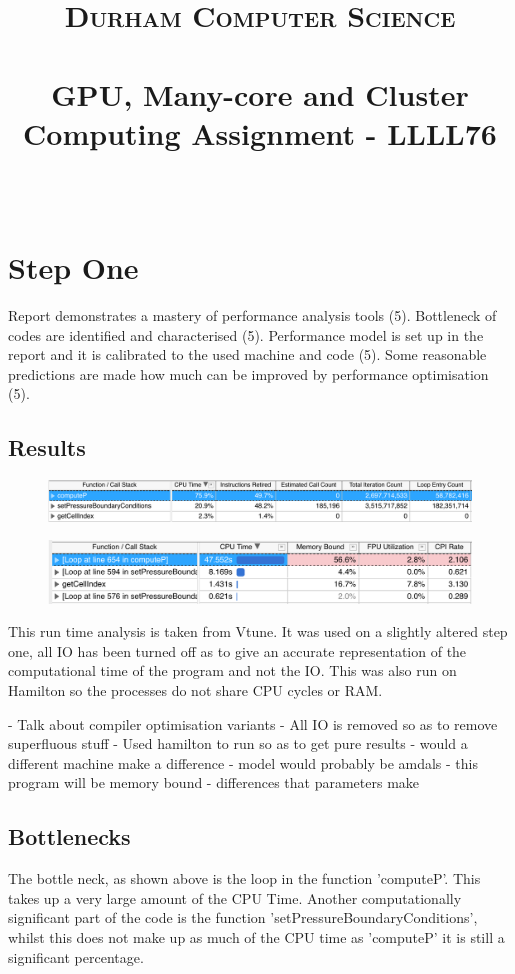 \documentclass[paper=a4, fontsize=11pt]{scrartcl}
\date{}
\title{
		\vspace{-1in} 	
		\usefont{OT1}{bch}{b}{n}
		\normalfont \normalsize \textsc{Durham Computer Science} \\ [5pt]
		\horrule{0.5pt} \\[0.4cm]
		\huge  GPU, Many-core and Cluster Computing Assignment - LLLL76\\
		\horrule{2pt} \\[0.5cm]
		\vspace{-1in} 	
}
\numberwithin{equation}{section}		%
\numberwithin{figure}{section}			%
\numberwithin{table}{section}				%
\begin{document}
\maketitle
\section{Step One}
Report demonstrates a mastery of performance analysis tools (5). Bottleneck of codes are identified and characterised (5). Performance model is set up in the report and it is calibrated to the used machine and code (5). Some reasonable predictions are made how much can be improved by performance optimisation (5).
\subsection{Results}
\begin{figure}[h]
\caption{}
\includegraphics[width=\textwidth]{one.png}
\end{figure}
\begin{figure}[h]
\caption{}
\includegraphics[width=\textwidth]{two.png}
\end{figure}

This run time analysis is taken from Vtune. It was used on a slightly altered step one, all IO has been turned off as to give an accurate representation of the computational time of the program and not the IO. This was also run on Hamilton so the processes do not share CPU cycles or RAM.

- Talk about compiler optimisation variants
- All IO is removed so as to remove superfluous stuff
- Used hamilton to run so as to get pure results
- would a different machine make a difference
- model would probably be amdals
- this program will be memory bound
- differences that parameters make

\subsection{Bottlenecks}

The bottle neck, as shown above is the loop in the function 'computeP'. This takes up a very large amount of the CPU Time. Another computationally significant part of the code is the function 'setPressureBoundaryConditions', whilst this does not make up as much of the CPU time as 'computeP' it is still a significant percentage.
\end{document}
